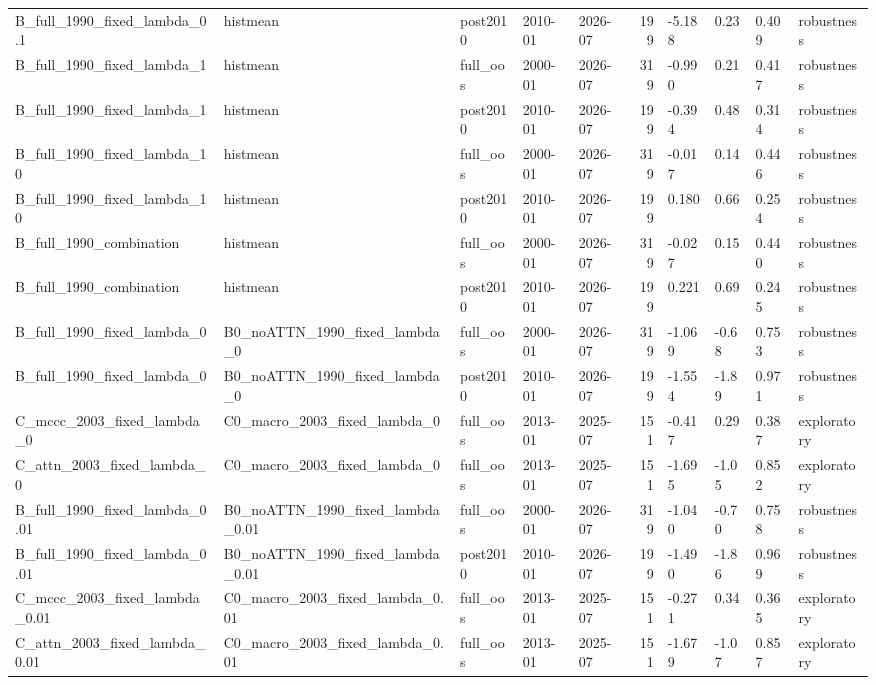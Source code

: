 \begin{table}
\begin{tabular}{lllllrllll}
B\_full\_1990\_fixed\_lambda\_0.1 & histmean & post2010 & 2010-01 & 2026-07 & 199 & -5.188 & 0.23 & 0.409 & robustness \\
B\_full\_1990\_fixed\_lambda\_1 & histmean & full\_oos & 2000-01 & 2026-07 & 319 & -0.990 & 0.21 & 0.417 & robustness \\
B\_full\_1990\_fixed\_lambda\_1 & histmean & post2010 & 2010-01 & 2026-07 & 199 & -0.394 & 0.48 & 0.314 & robustness \\
B\_full\_1990\_fixed\_lambda\_10 & histmean & full\_oos & 2000-01 & 2026-07 & 319 & -0.017 & 0.14 & 0.446 & robustness \\
B\_full\_1990\_fixed\_lambda\_10 & histmean & post2010 & 2010-01 & 2026-07 & 199 & 0.180 & 0.66 & 0.254 & robustness \\
B\_full\_1990\_combination & histmean & full\_oos & 2000-01 & 2026-07 & 319 & -0.027 & 0.15 & 0.440 & robustness \\
B\_full\_1990\_combination & histmean & post2010 & 2010-01 & 2026-07 & 199 & 0.221 & 0.69 & 0.245 & robustness \\
B\_full\_1990\_fixed\_lambda\_0 & B0\_noATTN\_1990\_fixed\_lambda\_0 & full\_oos & 2000-01 & 2026-07 & 319 & -1.069 & -0.68 & 0.753 & robustness \\
B\_full\_1990\_fixed\_lambda\_0 & B0\_noATTN\_1990\_fixed\_lambda\_0 & post2010 & 2010-01 & 2026-07 & 199 & -1.554 & -1.89 & 0.971 & robustness \\
C\_mccc\_2003\_fixed\_lambda\_0 & C0\_macro\_2003\_fixed\_lambda\_0 & full\_oos & 2013-01 & 2025-07 & 151 & -0.417 & 0.29 & 0.387 & exploratory \\
C\_attn\_2003\_fixed\_lambda\_0 & C0\_macro\_2003\_fixed\_lambda\_0 & full\_oos & 2013-01 & 2025-07 & 151 & -1.695 & -1.05 & 0.852 & exploratory \\
B\_full\_1990\_fixed\_lambda\_0.01 & B0\_noATTN\_1990\_fixed\_lambda\_0.01 & full\_oos & 2000-01 & 2026-07 & 319 & -1.040 & -0.70 & 0.758 & robustness \\
B\_full\_1990\_fixed\_lambda\_0.01 & B0\_noATTN\_1990\_fixed\_lambda\_0.01 & post2010 & 2010-01 & 2026-07 & 199 & -1.490 & -1.86 & 0.969 & robustness \\
C\_mccc\_2003\_fixed\_lambda\_0.01 & C0\_macro\_2003\_fixed\_lambda\_0.01 & full\_oos & 2013-01 & 2025-07 & 151 & -0.271 & 0.34 & 0.365 & exploratory \\
C\_attn\_2003\_fixed\_lambda\_0.01 & C0\_macro\_2003\_fixed\_lambda\_0.01 & full\_oos & 2013-01 & 2025-07 & 151 & -1.679 & -1.07 & 0.857 & exploratory \\

\end{tabular}
\end{table}

